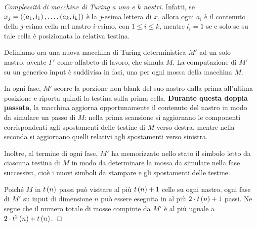 \documentclass{lectures}
\begin{document}
\begin{multicols}{2}
\begin{proof}[Complessità di macchine di Turing a uno e \(k\) nastri]
    Infatti, se \(x_j = \left(\left(a_1, l_1\right), \ldots, \left(a_k, l_k\right)\right)\) è la \(j\)-esima lettera di \(x\), allora ogni \(a_i\) è il contenuto della \(j\)-esima cella nel nastro \(i\)-esimo, con \(1\leq i \leq k\), mentre \(l_i = 1\) se e solo se su tale cella è posizionata la relativa testina.
    
    Definiamo ora una nuova macchina di Turing deterministica \(M'\) ad un solo nastro, avente \(\Gamma'\) come alfabeto di lavoro, che simula \(M\). La computazione di \(M'\) su un generico input è suddivisa in fasi, una per ogni mossa della macchina \(M\).
    
    In ogni fase, \(M'\) scorre la porzione non blank del suo nastro dalla prima all'ultima posizione e riporta quindi la testina sulla prima cella. \textbf{Durante questa doppia passata}, la macchina aggiorna opportunamente il contenuto del nastro in modo da simulare un passo di \(M\): nella prima scansione si aggiornano le componenti corrispondenti agli spostamenti delle testine di \(M\) verso destra, mentre nella seconda si aggiornano quelli relativi agli spostamenti verso sinistra.

    Inoltre, al termine di ogni fase, \(M'\) ha memorizzato nello stato il simbolo letto da ciascuna testina di \(M\) in modo da determinare la mossa da simulare nella fase successiva, cioè i nuovi simboli da stampare e gli spostamenti delle testine.
    
    Poiché \(M\) in \(t\left(n\right)\) passi può visitare al più \(t\left(n\right)+1\) celle su ogni nastro, ogni fase di \(M'\) su input di dimensione \(n\) può essere eseguita in al più \(2\cdot t\left(n\right)+1\) passi. Ne segue che il numero totale di mosse compiute da \(M'\) è al più uguale a \(2\cdot t^2\left(n\right) + t\left(n\right)\).
\end{proof}
\end{multicols}
\clearpage
\end{document}
